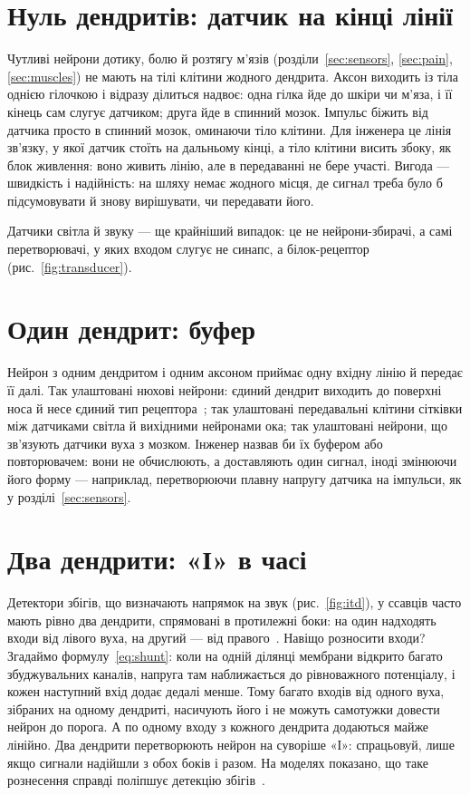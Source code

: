 \section{Нуль дендритів: датчик на кінці лінії}

Чутливі нейрони дотику, болю й розтягу м'язів (розділи~\ref{sec:sensors}, \ref{sec:pain}, \ref{sec:muscles}) не мають на тілі клітини жодного дендрита. Аксон виходить із тіла однією гілочкою і відразу ділиться надвоє: одна гілка йде до шкіри чи м'яза, і її кінець сам слугує датчиком; друга йде в спинний мозок. Імпульс біжить від датчика просто в спинний мозок, оминаючи тіло клітини. Для інженера це лінія зв'язку, у якої датчик стоїть на дальньому кінці, а тіло клітини висить збоку, як блок живлення: воно живить лінію, але в передаванні не бере участі. Вигода --- швидкість і надійність: на шляху немає жодного місця, де сигнал треба було б підсумовувати й знову вирішувати, чи передавати його.

Датчики світла й звуку --- ще крайніший випадок: це не нейрони-збирачі, а самі перетворювачі, у яких входом слугує не синапс, а білок-рецептор (рис.~\ref{fig:transducer}).

\section{Один дендрит: буфер}

Нейрон з одним дендритом і одним аксоном приймає одну вхідну лінію й передає її далі. Так улаштовані нюхові нейрони: єдиний дендрит виходить до поверхні носа й несе єдиний тип рецептора~\cite{Mombaerts2004}; так улаштовані передавальні клітини сітківки між датчиками світла й вихідними нейронами ока; так улаштовані нейрони, що зв'язують датчики вуха з мозком. Інженер назвав би їх буфером або повторювачем: вони не обчислюють, а доставляють один сигнал, іноді змінюючи його форму --- наприклад, перетворюючи плавну напругу датчика на імпульси, як у розділі~\ref{sec:sensors}.

\section{Два дендрити: «І» в часі}

Детектори збігів, що визначають напрямок на звук (рис.~\ref{fig:itd}), у ссавців часто мають рівно два дендрити, спрямовані в протилежні боки: на один надходять входи від лівого вуха, на другий --- від правого~\cite{Grothe2010}. Навіщо розносити входи? Згадаймо формулу~\eqref{eq:shunt}: коли на одній ділянці мембрани відкрито багато збуджувальних каналів, напруга там наближається до рівноважного потенціалу, і кожен наступний вхід додає дедалі менше. Тому багато входів від одного вуха, зібраних на одному дендриті, насичують його і не можуть самотужки довести нейрон до порога. А по одному входу з кожного дендрита додаються майже лінійно. Два дендрити перетворюють нейрон на суворіше «І»: спрацьовуй, лише якщо сигнали надійшли з обох боків і разом. На моделях показано, що таке рознесення справді поліпшує детекцію збігів~\cite{AgmonSnir1998}.

